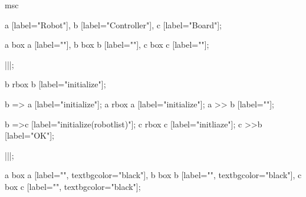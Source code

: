 \begin{msc}
msc
{

a [label="Robot"],
b [label="Controller"],
c [label="Board"];

a box a [label=""],
b box b [label=""],
c box c [label=""];

|||;

b rbox b [label="initialize"];

b => a [label="initialize"];
a rbox a [label="initialize"];
a >> b [label=""];

b =>c [label="initialize(robotlist)"];
c rbox c [label="initliaze"];
c >>b [label="OK"];

|||;

a box a [label="", textbgcolor="black"],
b box b [label="", textbgcolor="black"],
c box c [label="", textbgcolor="black"];

}
\end{msc}
